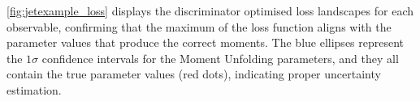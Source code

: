            \cref{fig:jetexample_loss} displays the discriminator optimised loss landscapes for each observable, confirming that the maximum of the loss function aligns with the parameter values that produce the correct moments.
            The blue ellipses represent the \(1\sigma\) confidence intervals for the Moment Unfolding parameters, and they all contain the true parameter values (red dots), indicating proper uncertainty estimation.
\begin{figure}
    \\
    

\end{figure}
